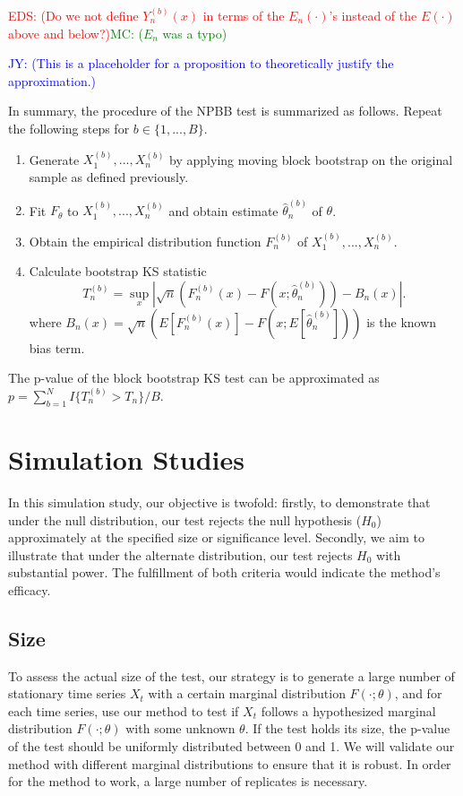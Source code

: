 \documentclass[APA,Times1COL]{WileyNJDv5} %
\newcommand{\jy}[1]{\textcolor{blue}{JY: (#1)}}
\newcommand{\eds}[1]{\textcolor{red}{EDS: (#1)}}
\newcommand{\mc}[1]{\textcolor{green}{MC: (#1)}}
\begin{document}
\eds{Do we not define $Y^{(b)}_n(x)$ in terms of the $E_n(\cdot)$'s instead of 
  the $E(\cdot)$ above and below?}\mc{$E_n$ was a typo}

\jy{This is a placeholder for a proposition to theoretically justify the
  approximation.}
\lipsum[1-2]

In summary, the procedure of the NPBB test is 
summarized as follows. Repeat the following steps for $b \in \{1, ..., B\}$.
\begin{enumerate}
\item
  Generate $X^{(b)}_1,...,X^{(b)}_n$ by applying moving block bootstrap 
  on the original sample as
  defined previously.
\item
  Fit $F_\theta$ to $X^{(b)}_1,...,X^{(b)}_n$ and obtain estimate 
	$\hat\theta^{(b)}_n$ of $\theta$.
\item
  Obtain the empirical distribution function $F^{(b)}_n$ of
  $X^{(b)}_1,...,X^{(b)}_n$. 
\item
  Calculate bootstrap KS statistic
  \[
    T^{(b)}_n = \sup_x | \sqrt{n}\left(F^{(b)}_n(x) 
    - F(x; \hat\theta^{(b)}_n)\right) - B_n(x) |.
  \]
  where 
  $B_{n}(x) = \sqrt{n}(E[F^{(b)}_n(x)] - 
  F(x; E[\hat\theta^{(b)}_n]))$ is the known
  bias term.
\end{enumerate}


The p-value of the block bootstrap KS test can be approximated
as $p = \sum_{b=1}^N I\{T^{(b)}_n > T_n\} / B$.

\section{Simulation Studies}\label{sec:simu}

In this simulation study, our objective is twofold: firstly, to demonstrate that
under the null distribution, our test rejects the null hypothesis ($H_0$) 
approximately at the specified size or significance level. Secondly, we aim to
illustrate that under the alternate distribution, our test rejects
$H_0$ with substantial power. The fulfillment of both criteria would indicate
the method's efficacy.


\subsection{Size}
To assess the actual size of the test, our strategy is to
generate a large number of stationary time series $X_t$ with a certain marginal
distribution $F(\cdot; \theta)$, and for each time series, use our method to
test if $X_t$ follows a hypothesized marginal distribution $F(\cdot; \theta)$
with some unknown $\theta$. If the test holds its size, the p-value
of the test should be uniformly distributed between 0 and 1. We will validate
our method with different marginal distributions to ensure that it is robust.
In order for the method to work, a large number of replicates is necessary. 
\end{document}
